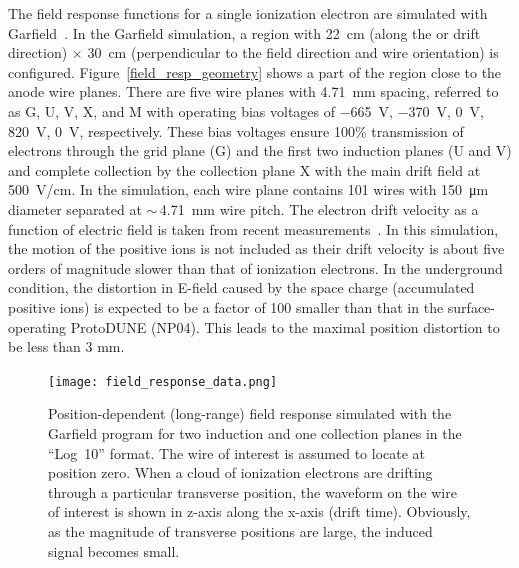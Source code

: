 The field response functions for a single ionization electron are simulated with Garfield~\cite{garfield}.  
In the Garfield simulation, a region with \SI{22}{cm} (along the \efield or drift direction) $\times$ 
\SI{30}{cm} (perpendicular to the field direction and wire orientation) is configured.  
Figure~\ref{field_resp_geometry} shows a part of the region close to the anode wire planes. There are five wire planes with \SI{4.71}{mm} spacing, referred to as G, U, V, X, and 
M with operating bias voltages of \SI{-665}{V}, \SI{-370}{V}, \SI{0}{V}, \SI{820}{V}, \SI{0}{V}, respectively.  
These bias voltages ensure 100\% transmission of electrons through the grid plane (G) and the 
first two induction planes (U and V) and complete collection by the collection plane X with the main drift 
field at \SI{500}{V/cm}. In the simulation, each wire plane contains 101 wires with \SI{150}{\micro\meter} diameter
  separated at $\sim\,$\SI{4.71}{\mm} wire pitch. The electron drift velocity as a function of electric
  field is taken from recent measurements~\cite{Li:2015rqa,larpropertiesbnl}. In this simulation, the motion of the positive ions is not included as their drift velocity is about five orders of magnitude slower than that of ionization electrons. In the underground condition, the distortion in E-field caused by the space charge (accumulated positive ions) is expected to be a factor of 100 smaller than that in the surface-operating ProtoDUNE (NP04). This  leads to the maximal position distortion to be less than 3 mm. 

 \begin{figure}[!htp]
  \centering
  \texttt{[image: field\_response\_data.png]}
\caption[Position-dependent (long-range) field response simulated with the Garfield program]{Position-dependent (long-range) field response simulated with the Garfield program 
for two induction and one collection planes in the ``Log~10'' format. The wire of interest 
is assumed to locate at position zero. When a cloud of ionization electrons are drifting through a particular transverse position, the waveform on the wire of interest is shown in z-axis along the x-axis (drift time). Obviously, as the magnitude of transverse positions are large, the induced signal becomes small. }
\label{field_resp}
\end{figure}

